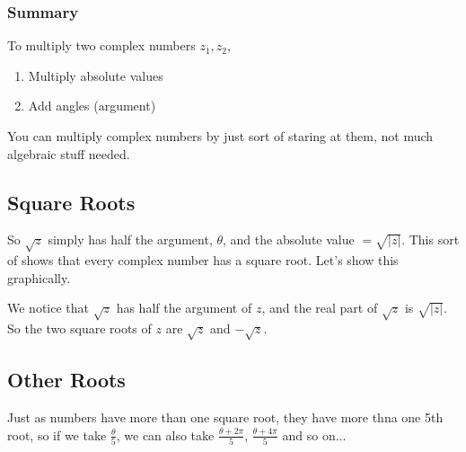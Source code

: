 \documentclass{article}
\begin{document}
\subsubsection{Summary}
To multiply two complex numbers $z_1, z_2$,
\begin{enumerate}
	\item Multiply absolute values
	\item Add angles (argument)
\end{enumerate}
You can multiply complex numbers by just sort of staring at them, not much algebraic stuff needed.

\subsection{Square Roots}
So $\sqrt{z}$ simply has half the argument, $\theta$, and the absolute value $= \sqrt{|z|}$. This sort
of shows that every complex number has a square root. Let's show this graphically.

\begin{center}
\end{center}
We notice that $\sqrt{z}$ has half the argument of $z$, and the real part
of $\sqrt{z}$ is $\sqrt{|z|}$. So the two square roots of $z$ are
$\sqrt{z}$ and $-\sqrt{z}$.

\subsection{Other Roots}
Just as numbers have more than one square root, they have more thna
one 5th root, so if we take $\frac{\theta}{5}$, we can also take $\frac{\theta + 2\pi}{5}$,
$\frac{\theta+4\pi}{5}$ and so on...
\end{document}
